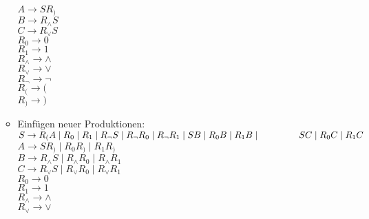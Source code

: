 \documentclass[11pt]{article}
\begin{document}
\begin{enumerate}
\begin{itemize}
\\\hspace*{6mm} $A \rightarrow SR_{)}$
\\\hspace*{6mm} $B \rightarrow R_{\wedge} S$
\\\hspace*{6mm} $C \rightarrow R_{\vee} S$
\\\hspace*{6mm} $R_{0} \rightarrow 0$
\\\hspace*{6mm} $R_{1} \rightarrow 1$
\\\hspace*{6mm} $R_{\wedge} \rightarrow \wedge$
\\\hspace*{6mm} $R_{\vee} \rightarrow \vee$
\\\hspace*{6mm} $R_{\neg} \rightarrow \neg$
\\\hspace*{6mm} $R_{(} \rightarrow ($
\\\hspace*{6mm} $R_{)} \rightarrow )$
\\\hspace*{6mm}
\item Einfügen neuer Produktionen:
\\\hspace*{6mm} $S \rightarrow R_{(}A\mid R_{0} \mid R_{1}\mid R_{\neg} S \mid R_{\neg} R_{0} \mid R_{\neg} R_{1} \mid S B \mid R_{0}B \mid R_{1}B \mid \hspace*{15mm} SC \mid R_{0} C \mid R_{1}C$
\\\hspace*{6mm} $A \rightarrow SR_{)} \mid R_{0}R_{)}\mid R_{1}R_{)}$
\\\hspace*{6mm} $B \rightarrow R_{\wedge} S \mid R_{\wedge}R_{0} \mid R_{\wedge}R_{1}$
\\\hspace*{6mm} $C \rightarrow R_{\vee} S \mid R_{\vee}R_{0} \mid R_{\vee}R_{1}$
\\\hspace*{6mm} $R_{0} \rightarrow 0$
\\\hspace*{6mm} $R_{1} \rightarrow 1$
\\\hspace*{6mm} $R_{\wedge} \rightarrow \wedge$
\\\hspace*{6mm} $R_{\vee} \rightarrow \vee$

\end{itemize}
\end{enumerate}
\end{document}
